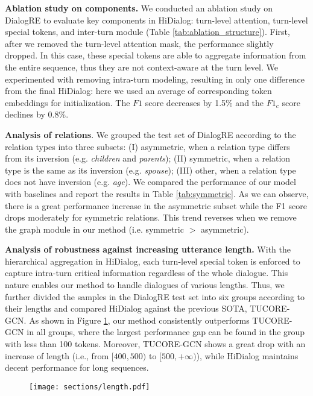 \textbf{Ablation study on components.} We conducted an ablation study on DialogRE to evaluate key components in HiDialog: turn-level attention, turn-level special tokens, and inter-turn module (Table \ref{tab:ablation_structure}). First, after we removed the turn-level attention mask, the performance slightly dropped. In this case, these special tokens are able to aggregate information from the entire sequence, thus they are not context-aware at the turn level. We experimented with removing intra-turn modeling, resulting in only one difference from the final HiDialog: here we used an average of corresponding token embeddings for initialization. The $F1$ score decreases by 1.5\% and the $F1_c$ score declines by 0.8\%.

\textbf{Analysis of relations}. We grouped the test set of DialogRE according to the relation types into three subsets: (I) asymmetric, when a relation type differs from its inversion (e.g. \textit{children} and \textit{parents});  (II) symmetric, when a relation type is the same as its inversion (e.g. \textit{spouse}); (III) other, when a relation type does not have inversion (e.g. \textit{age}). We compared the performance of our model with baselines and report the results in Table \ref{tab:symmetric}. As we can observe, there is a great performance increase in the asymmetric subset while the F1 score drops moderately for symmetric relations. This trend reverses when we remove the graph module in our method (i.e. symmetric $>$ asymmetric). 

\textbf{Analysis of robustness against increasing utterance length.} With the hierarchical aggregation in HiDialog, each turn-level special token is enforced to capture intra-turn critical information regardless of the whole dialogue. This nature enables our method to handle dialogues of various lengths. Thus, we further divided the samples in the DialogRE test set into six groups according to their lengths and compared HiDialog against the previous SOTA, TUCORE-GCN. As shown in Figure \ref{fig:length}, our method consistently outperforms TUCORE-GCN in all groups, where the largest performance gap can be found in the group with less than 100 tokens. Moreover, TUCORE-GCN shows a great drop with an increase of length (i.e., from $[400,500)$ to $[500,+\infty)$), while HiDialog maintains decent performance for long sequences.

 \begin{figure}[t]
\centering
\footnotesize
\centering
\texttt{[image: sections/length.pdf]}
\label{fig:length}
\end{figure}



